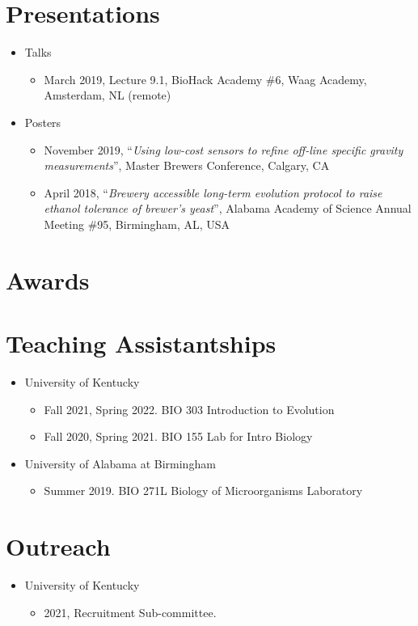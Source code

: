 \documentclass[11pt]{article}
\begin{document}
    \section*{Presentations}
        \begin{itemize}[leftmargin=.25in]
            \item Talks
                \begin{itemize}
                    \item March 2019, Lecture 9.1, BioHack Academy \#6, Waag Academy, Amsterdam, NL (remote)
                \end{itemize}
            \item Posters
                \begin{itemize}
                    \item November 2019, “{\it Using low-cost sensors to refine off-line specific gravity measurements}”, Master Brewers Conference, Calgary, CA
                    \item April 2018, “{\it Brewery accessible long-term evolution protocol to raise ethanol tolerance of brewer’s yeast}”, Alabama Academy of Science Annual Meeting \#95, Birmingham, AL, USA
                \end{itemize}
        \end{itemize}


    \section*{Awards}


    \section*{Teaching Assistantships}
        \begin{itemize}[leftmargin=.25in]
            \item University of Kentucky
                \begin{itemize}
                \item Fall 2021, Spring 2022. BIO 303 Introduction to Evolution
                \item Fall 2020, Spring 2021. BIO 155 Lab for Intro Biology
                \end{itemize}
            \item University of Alabama at Birmingham
                \begin{itemize}
                \item Summer 2019. BIO 271L Biology of Microorganisms Laboratory
                \end{itemize}
        \end{itemize}


    \section*{Outreach}
        \begin{itemize}[leftmargin=.25in]
            \item University of Kentucky
                \begin{itemize}
                    \item 2021, Recruitment Sub-committee. 
                \end{itemize}
        
        \end{itemize} 
\end{document}

